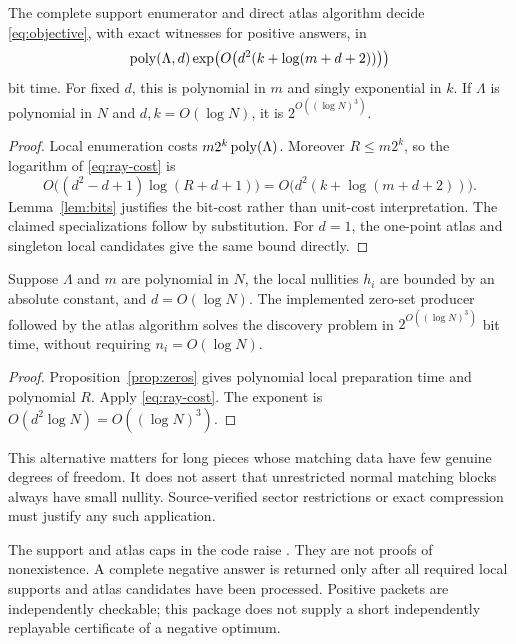 \begin{theorem}
\label{thm:cost}
The complete support enumerator and direct atlas algorithm decide \eqref{eq:objective}, with exact witnesses for positive answers, in
\begin{equation}
 \operatorname{poly}(\Lambda,d)\exp\!\left(O\bigl(d^2(k+\log(m+d+2))\bigr)\right)
 \label{eq:cost}
\end{equation}
bit time. For fixed $d$, this is polynomial in $m$ and singly exponential in $k$. If $\Lambda$ is polynomial in $N$ and $d,k=O(\log N)$, it is $2^{O((\log N)^3)}$.
\end{theorem}
\begin{proof}
Local enumeration costs $m2^k\operatorname{poly}(\Lambda)$. Moreover $R\le m2^k$, so the logarithm of \eqref{eq:ray-cost} is
\[
 O\bigl((d^2-d+1)\log(R+d+1)\bigr)
 =O\bigl(d^2(k+\log(m+d+2))\bigr).
\]
Lemma~\ref{lem:bits} justifies the bit-cost rather than unit-cost interpretation. The claimed specializations follow by substitution. For $d=1$, the one-point atlas and singleton local candidates give the same bound directly.
\end{proof}

\begin{corollary}
\label{cor:nullity}
Suppose $\Lambda$ and $m$ are polynomial in $N$, the local nullities $h_i$ are bounded by an absolute constant, and $d=O(\log N)$. The implemented zero-set producer followed by the atlas algorithm solves the discovery problem in $2^{O((\log N)^3)}$ bit time, without requiring $n_i=O(\log N)$.
\end{corollary}
\begin{proof}
Proposition~\ref{prop:zeros} gives polynomial local preparation time and polynomial $R$. Apply \eqref{eq:ray-cost}. The exponent is $O(d^2\log N)=O((\log N)^3)$.
\end{proof}

This alternative matters for long pieces whose matching data have few genuine degrees of freedom. It does not assert that unrestricted normal matching blocks always have small nullity. Source-verified sector restrictions or exact compression must justify any such application.

The support and atlas caps in the code raise . They are not proofs of nonexistence. A complete negative answer is returned only after all required local supports and atlas candidates have been processed. Positive packets are independently checkable; this package does not supply a short independently replayable certificate of a negative optimum.

